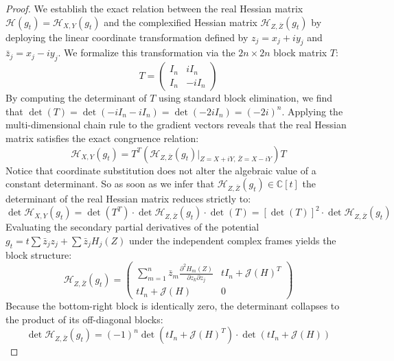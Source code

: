 \documentclass[11pt,a4paper]{article}
\begin{document}
\begin{proof}
We establish the exact relation between the real Hessian matrix $\mathcal{H}(g_t) = \mathcal{H}_{X,Y}(g_t)$ and the complexified Hessian matrix $\mathcal{H}_{Z,\bar{Z}}(g_t)$ by deploying the linear coordinate transformation defined by $z_j = x_j + i y_j$ and $\bar{z}_j = x_j - i y_j$. We formalize this transformation via the $2n \times 2n$ block matrix $T$:
\begin{equation}
T = 
\begin{pmatrix}
I_n & i I_n \\
I_n & -i I_n
\end{pmatrix}
\end{equation}
By computing the determinant of $T$ using standard block elimination, we find that $\det(T) = \det(-i I_n - i I_n) = \det(-2i I_n) = (-2i)^n$. Applying the multi-dimensional chain rule to the gradient vectors reveals that the real Hessian matrix satisfies the exact congruence relation:
\begin{equation}
\mathcal{H}_{X,Y}(g_t) = T^T \left( \mathcal{H}_{Z,\bar{Z}}(g_t)\big|_{Z = X + iY, \, \bar{Z} = X - iY} \right) T
\end{equation}
Notice that coordinate substitution does not alter the algebraic value of a constant determinant. So as soon as we infer that $\mathcal{H}_{Z,\bar{Z}}(g_t) \in \mathbb{C}[t]$ the determinant of the real Hessian matrix reduces strictly to:
\begin{equation}
\det \mathcal{H}_{X,Y}(g_t) = \det(T^T) \cdot \det \mathcal{H}_{Z,\bar{Z}}(g_t) \cdot \det(T) = \left[ \det(T) \right]^2 \cdot \det \mathcal{H}_{Z,\bar{Z}}(g_t)
\end{equation}
Evaluating the secondary partial derivatives of the potential $g_t = t \sum \bar{z}_j z_j + \sum \bar{z}_j H_j(Z)$ under the independent complex frames yields the block structure:
\begin{equation}
\mathcal{H}_{Z,\bar{Z}}(g_t) = 
\begin{pmatrix}
\sum_{m=1}^n \bar{z}_m \frac{\partial^2 H_m(Z)}{\partial z_k \partial z_j} & t I_n + \mathcal{J}(H)^T \\
t I_n + \mathcal{J}(H) & 0
\end{pmatrix}
\end{equation}
Because the bottom-right block is identically zero, the determinant collapses to the product of its off-diagonal blocks:
\begin{equation}
\det \mathcal{H}_{Z,\bar{Z}}(g_t) = (-1)^n \det\left( t I_n + \mathcal{J}(H)^T \right) \cdot \det\left( t I_n + \mathcal{J}(H) \right)

\end{equation}
\end{proof}
\end{document}
